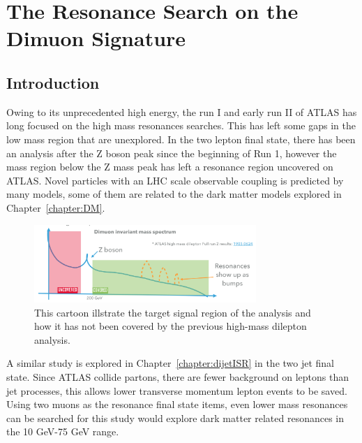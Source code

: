 \chapter{The Resonance Search on the Dimuon Signature}
\label{chapter:dimuon}


\section{Introduction}

    Owing to its unprecedented high energy, the run I and early run II of ATLAS has long focused on the high mass resonances searches. This has left some gaps in the low mass region that are unexplored. In the two lepton final state, there has been an analysis after the Z boson peak since the beginning of Run 1, however the mass region below the Z mass peak has left a resonance region uncovered on ATLAS. Novel particles with an LHC scale observable coupling is predicted by many models, some of them are related to the dark matter models explored in Chapter~\ref{chapter:DM}.

\begin{figure}[!htb]
    \begin{center}
        \includegraphics[width=0.75\textwidth]{figures/chapter_dimuon/dimuonStudies}        
        \caption{
        This cartoon illstrate the target signal region of the analysis and how it has not been covered by the previous high-mass dilepton analysis. }
            \label{fig:dimuonstudies}
    \end{center}
\end{figure}
   
A similar study is explored in Chapter~\ref{chapter:dijetISR} in the two jet final state. Since ATLAS collide partons, there are fewer background on leptons than jet processes, this allows lower transverse momentum lepton events to be saved. Using two muons as the resonance final state items, even lower mass resonances can be searched for this study would explore dark matter related resonances in the 10 GeV-75 GeV range.

